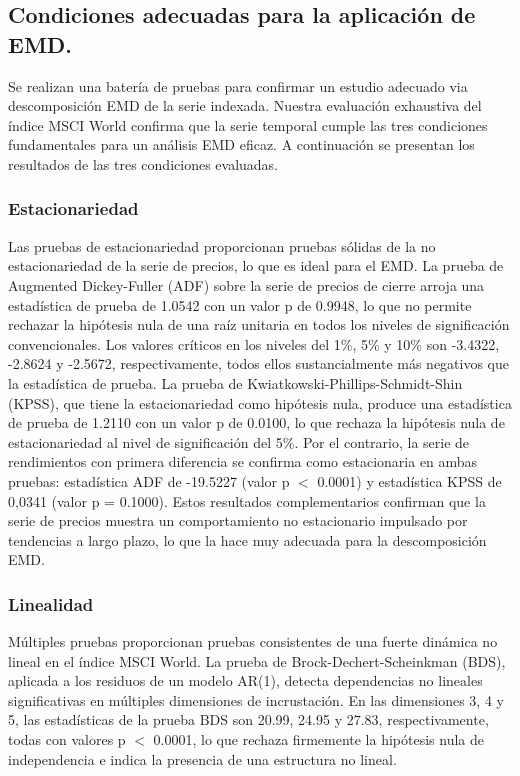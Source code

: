 \documentclass[11pt,a4paper]{article}
\begin{document}
\subsection{Condiciones adecuadas para la aplicación de EMD.}
\label{sec:suitcondemd}

Se realizan una batería de pruebas para confirmar un estudio adecuado via descomposición EMD de la serie indexada. Nuestra evaluación exhaustiva del índice MSCI World confirma que la serie temporal cumple las tres condiciones fundamentales para un análisis EMD eficaz. A continuación se presentan los resultados de las tres condiciones evaluadas.

\subsubsection{Estacionariedad}
Las pruebas de estacionariedad proporcionan pruebas sólidas de la no estacionariedad de la serie de precios, lo que es ideal para el EMD. La prueba de Augmented Dickey-Fuller (ADF) sobre la serie de precios de cierre arroja una estadística de prueba de 1.0542 con un valor p de 0.9948, lo que no permite rechazar la hipótesis nula de una raíz unitaria en todos los niveles de significación convencionales. Los valores críticos en los niveles del 1\%, 5\% y 10\% son -3.4322, -2.8624 y -2.5672, respectivamente, todos ellos sustancialmente más negativos que la estadística de prueba. La prueba de Kwiatkowski-Phillips-Schmidt-Shin (KPSS), que tiene la estacionariedad como hipótesis nula, produce una estadística de prueba de 1.2110 con un valor p de 0.0100, lo que rechaza la hipótesis nula de estacionariedad al nivel de significación del 5\%. Por el contrario, la serie de rendimientos con primera diferencia se confirma como estacionaria en ambas pruebas: estadística ADF de -19.5227 (valor p $<$ 0.0001) y estadística KPSS de 0,0341 (valor p = 0.1000). Estos resultados complementarios confirman que la serie de precios muestra un comportamiento no estacionario impulsado por tendencias a largo plazo, lo que la hace muy adecuada para la descomposición EMD.

\subsubsection{Linealidad}
Múltiples pruebas proporcionan pruebas consistentes de una fuerte dinámica no lineal en el índice MSCI World. La prueba de Brock-Dechert-Scheinkman (BDS), aplicada a los residuos de un modelo AR(1), detecta dependencias no lineales significativas en múltiples dimensiones de incrustación. En las dimensiones 3, 4 y 5, las estadísticas de la prueba BDS son 20.99, 24.95 y 27.83, respectivamente, todas con valores p $<$ 0.0001, lo que rechaza firmemente la hipótesis nula de independencia e indica la presencia de una estructura no lineal.
\end{document}
